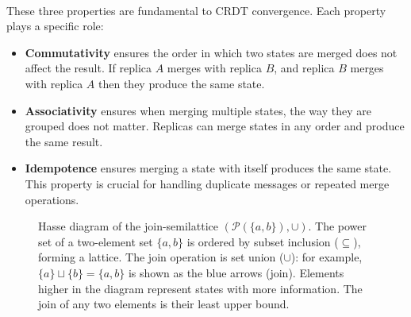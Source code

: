 \noindent \\These three properties are fundamental to CRDT convergence. Each property plays a specific role:

\begin{itemize}
  \item \textbf{Commutativity} ensures the order in which two states are merged does not affect the result. If replica $A$ merges with replica $B$, and replica $B$ merges with replica $A$ then they produce the same state.
  \item \textbf{Associativity} ensures when merging multiple states, the way they are grouped does not matter. Replicas can merge states in any order and produce the same result.
  \item \textbf{Idempotence} ensures merging a state with itself produces the same state. This property is crucial for handling duplicate messages or repeated merge operations.
\end{itemize}

\begin{figure}[h]
  \centering
  \caption{\footnotesize Hasse diagram of the join-semilattice $(\mathcal{P}(\{a,b\}), \cup)$. The power set of a two-element set $\{a, b\}$ is ordered by subset inclusion ($\subseteq$), forming a lattice. The join operation is set union ($\cup$): for example, $\{a\} \sqcup \{b\} = \{a,b\}$ is shown as the blue arrows (join). Elements higher in the diagram represent states with more information. The join of any two elements is their least upper bound.}
  \label{fig:semilattice-hasse}
\end{figure}

